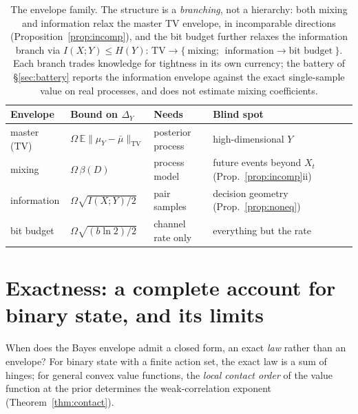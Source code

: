\documentclass[11pt]{article}
\newcommand{\TV}{\mathrm{TV}}
\newcommand{\E}{\mathbb{E}}
\begin{document}
\begin{table}[!ht]\centering\small
\begin{tabular}{llll}
\toprule
Envelope & Bound on $\Delta_Y$ & Needs & Blind spot \\
\midrule
master (TV) & $\Omega\,\E\|\mu_Y-\bar\mu\|_{\TV}$ & posterior process & high-dimensional $Y$ \\
mixing & $\Omega\,\beta(D)$ & process model & future events beyond $X_t$ (Prop.~\ref{prop:incomp}ii) \\
information & $\Omega\sqrt{I(X;Y)/2}$ & pair samples & decision geometry (Prop.~\ref{prop:noneq}) \\
bit budget & $\Omega\sqrt{(b\ln 2)/2}$ & channel rate only & everything but the rate \\
\bottomrule
\end{tabular}
\caption{The envelope family. The structure is a \emph{branching}, not a
hierarchy: both mixing and information relax the master TV envelope, in
incomparable directions (Proposition~\ref{prop:incomp}), and the bit budget
further relaxes the information branch via
$I(X;Y)\le H(Y)$:
$\text{TV} \rightarrow \{\ \text{mixing};\ \ \text{information}
\rightarrow \text{bit budget}\ \}$. Each branch trades knowledge for
tightness in its own currency; the battery of \S\ref{sec:battery} reports
the information envelope against the exact single-sample value on real
processes, and does not estimate mixing coefficients.}
\label{tab:envelopes}
\end{table}

\section{Exactness: a complete account for binary state, and its limits}
\label{sec:multistate}

When does the Bayes envelope admit a closed form, an exact \emph{law}
rather than an envelope? For binary state with a finite action set, the
exact law is a sum of hinges; for general convex value functions, the
\emph{local contact order} of the value function at the prior determines
the weak-correlation exponent (Theorem~\ref{thm:contact}).
\end{document}
